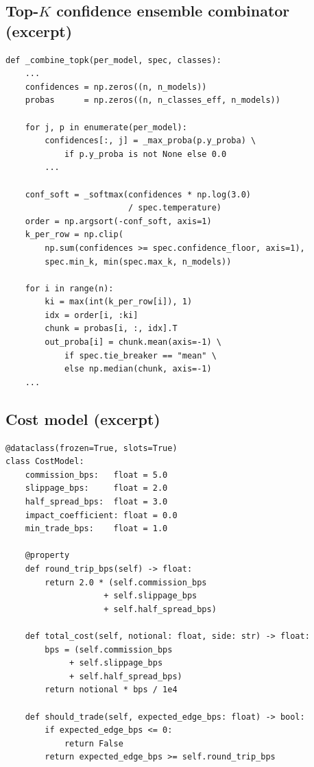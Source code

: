\documentclass[11pt,a4paper]{article}
\begin{document}
\subsection{Top-$K$ confidence ensemble combinator (excerpt)}
\begin{lstlisting}[caption={Excerpt of \texttt{kairon/models/ensemble.py}: the top-$K$ confidence
combinator. Per-row, the constituents are ranked by their
max-class probability, the top $K_i$ are kept, and the
selected probabilities are averaged.},label={lst:ensemble}]
def _combine_topk(per_model, spec, classes):
    ...
    confidences = np.zeros((n, n_models))
    probas      = np.zeros((n, n_classes_eff, n_models))

    for j, p in enumerate(per_model):
        confidences[:, j] = _max_proba(p.y_proba) \
            if p.y_proba is not None else 0.0
        ...

    conf_soft = _softmax(confidences * np.log(3.0)
                         / spec.temperature)
    order = np.argsort(-conf_soft, axis=1)
    k_per_row = np.clip(
        np.sum(confidences >= spec.confidence_floor, axis=1),
        spec.min_k, min(spec.max_k, n_models))

    for i in range(n):
        ki = max(int(k_per_row[i]), 1)
        idx = order[i, :ki]
        chunk = probas[i, :, idx].T
        out_proba[i] = chunk.mean(axis=-1) \
            if spec.tie_breaker == "mean" \
            else np.median(chunk, axis=-1)
    ...
\end{lstlisting}

\subsection{Cost model (excerpt)}
\begin{lstlisting}[caption={Excerpt of \texttt{kairon/backtest/cost.py}: the
per-side cost model. Round-trip cost is twice the one-side
cost; \texttt{should\_trade} implements the round-trip
edge-clearance filter.},label={lst:cost}]
@dataclass(frozen=True, slots=True)
class CostModel:
    commission_bps:   float = 5.0
    slippage_bps:     float = 2.0
    half_spread_bps:  float = 3.0
    impact_coefficient: float = 0.0
    min_trade_bps:    float = 1.0

    @property
    def round_trip_bps(self) -> float:
        return 2.0 * (self.commission_bps
                    + self.slippage_bps
                    + self.half_spread_bps)

    def total_cost(self, notional: float, side: str) -> float:
        bps = (self.commission_bps
             + self.slippage_bps
             + self.half_spread_bps)
        return notional * bps / 1e4

    def should_trade(self, expected_edge_bps: float) -> bool:
        if expected_edge_bps <= 0:
            return False
        return expected_edge_bps >= self.round_trip_bps
\end{lstlisting}
\end{document}

